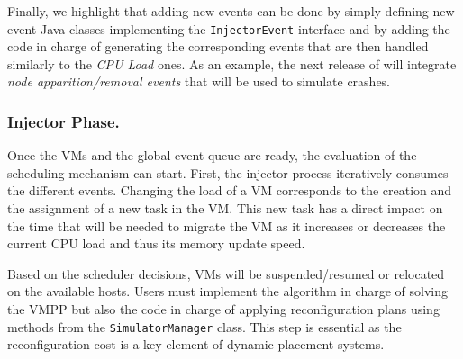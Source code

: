 
Finally, we highlight that adding new events can be done by simply
defining new event Java classes implementing the
\texttt{InjectorEvent} interface and by adding the code in charge of
generating the corresponding events that are then handled
similarly to the \emph{CPU Load}
ones.%
As an example, the next release of \vmps will integrate \emph{node
  apparition/removal events} that will be used to simulate crashes.

\subsubsection{Injector Phase.}

Once the VMs and the global event queue are ready, the evaluation of
the scheduling mechanism can start. First, the injector process
iteratively consumes the different events.  Changing the load of a VM
corresponds to the creation and the assignment of a new \sg task in
the VM. This new task has a direct impact on the time that will be
needed to migrate the VM as it increases or decreases the current CPU
load and thus %
its memory update speed.
%

Based on the scheduler decisions, VMs will be suspended/resumed
or relocated on the available hosts.
Users must implement the algorithm in charge of solving the VMPP but
also the code in charge of applying reconfiguration plans using
methods from the \texttt{SimulatorManager} class. This step is
essential as the reconfiguration cost is a key element of dynamic
placement systems.

